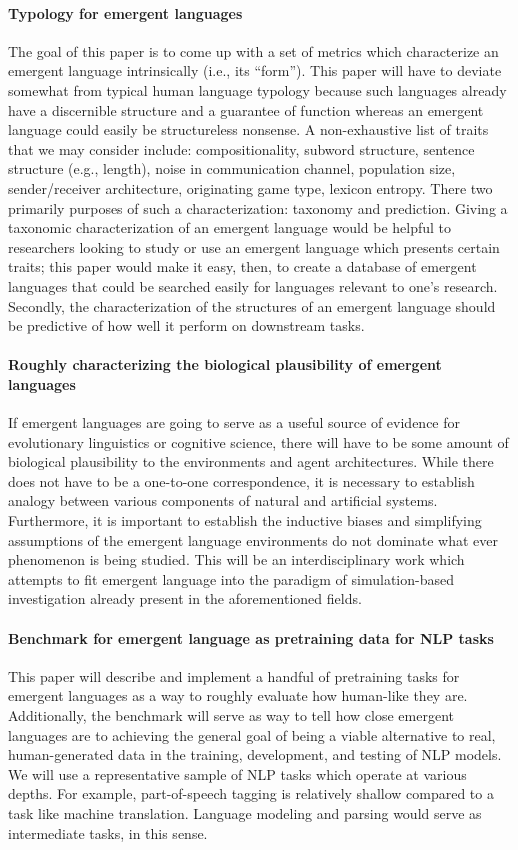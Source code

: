 \paragraph{Typology for emergent languages}
The goal of this paper is to come up with a set of metrics which characterize an emergent language intrinsically (i.e., its ``form'').
This paper will have to deviate somewhat from typical human language typology because such languages already have a discernible structure and a guarantee of function whereas an emergent language could easily be structureless nonsense.
A non-exhaustive list of traits that we may consider include:
    compositionality, subword structure, sentence structure (e.g., length), noise in communication channel, population size, sender/receiver architecture, originating game type, lexicon entropy.
There two primarily purposes of such a characterization: taxonomy and prediction.
Giving a taxonomic characterization of an emergent language would be helpful to researchers looking to study or use an emergent language which presents certain traits; this paper would make it easy, then, to create a database of emergent languages that could be searched easily for languages relevant to one's research.
Secondly, the characterization of the structures of an emergent language should be predictive of how well it perform on downstream tasks.

\paragraph{Roughly characterizing the biological plausibility of emergent languages}
If emergent languages are going to serve as a useful source of evidence for evolutionary linguistics or cognitive science, there will have to be some amount of biological plausibility to the environments and agent architectures.
While there does not have to be a one-to-one correspondence, it is necessary to establish analogy between various components of natural and artificial systems.
Furthermore, it is important to establish the inductive biases and simplifying assumptions of the emergent language environments do not dominate what ever phenomenon is being studied.
This will be an interdisciplinary work which attempts to fit emergent language into the paradigm of simulation-based investigation already present in the aforementioned fields.

\paragraph{Benchmark for emergent language as pretraining data for NLP tasks}
This paper will describe and implement a handful of pretraining tasks for emergent languages as a way to roughly evaluate how human-like they are.
Additionally, the benchmark will serve as way to tell how close emergent languages are to achieving the general goal of being a viable alternative to real, human-generated data in the training, development, and testing of NLP models.
We will use a representative sample of NLP tasks which operate at various depths.
For example, part-of-speech tagging is relatively shallow compared to a task like machine translation.
Language modeling and parsing would serve as intermediate tasks, in this sense.

